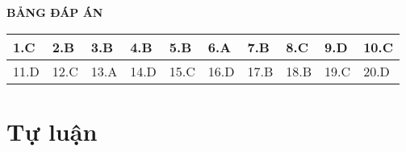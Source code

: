 \hideall
{
	\begin{center}
		\textbf{BẢNG ĐÁP ÁN}
	\end{center}
	\begin{center}
		\begin{tabular}{|m{2.8em}|m{2.8em}|m{2.8em}|m{2.8em}|m{2.8em}|m{2.8em}|m{2.8em}|m{2.8em}|m{2.8em}|m{2.8em}|}
			\hline
			1.C  & 2.B  & 3.B  & 4.B  & 5.B  & 6.A  & 7.B  & 8.C  & 9.D  & 10.C  \\
			\hline
			11.D  & 12.C  & 13.A  & 14.D  & 15.C  & 16.D  & 17.B  & 18.B  & 19.C  & 20.D  \\
			\hline
			
		\end{tabular}
	\end{center}
}
\section{Tự luận}
